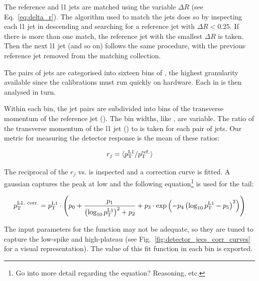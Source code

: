 The reference and \acrshort{l1} jets are matched using the variable $\Delta R$ (see Eq.~\ref{eq:delta_r}). The algorithm used to match the jets does so by inspecting each \acrshort{l1} jet in descending \pt and searching for a reference jet with $\Delta R < 0.25$. If there is more than one match, the reference jet with the smallest $\Delta R$ is taken. Then the next \acrshort{l1} jet (and so on) follows the same procedure, with the previous reference jet removed from the matching collection.

The pairs of jets are categorised into sixteen bins of \abseta, the highest granularity available since the calibrations must run quickly on hardware. Each in is then analysed in turn.

Within each \abseta bin, the jet pairs are subdivided into bins of the transverse momentum of the reference jet (\ptRef). The bin widths, like \abseta, are variable. The ratio of the transverse momentum of the \acrshort{l1} jet (\ptLOne) to \ptRef is taken for each pair of jets. Our metric for measuring the detector response is the mean of these ratios:

\begin{equation}
    r_j = \langle p_{\mathrm{T}}^{{\mathrm{L1}}} / p_{\mathrm{T}}^{{\mathrm{ref.}}} \rangle
    \label{eq:jec_detector_response}
\end{equation}

The reciprocal of the $r_j$ vs. \ptLOne is inspected and a correction curve is fitted. A gaussian captures the peak at low \pt and the following equation\footnote{Go into more detail regarding the equation? Reasoning, etc.} is used for the tail:

\begin{equation}
    p_{\mathrm{T}}^{{\mathrm{L1, \ corr.}}} = p_{\mathrm{T}}^{{\mathrm{L1}}} \cdot \left( p_0 + \frac{p_1}{ \left(\log_{10} p_{\mathrm{T}}^{{\mathrm{L1}}} \right) ^2 + p_2 } + p_3 \cdot \exp \left( -p_4 \left( \log_{10} p_{\mathrm{T}}^{{\mathrm{L1}}} - p_5 \right)^2 \right) \right)
    \label{eq:corr_curve_jec_tail}
\end{equation}

The input parameters for the function may not be adequate, so they are tuned to capture the low-\pt spike and high-\pt plateau (see Fig.~\ref{fig:detector_jecs_corr_curves} for a visual representation). The value of this fit function in each \ptRef bin is exported.

